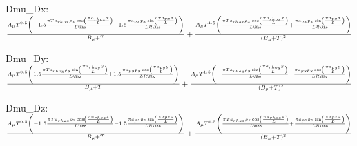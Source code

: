 

 Dmu_Dx: 
$\frac{A_{\mu} T^{0.5} \left(- 1.5 \frac{\pi T a_{rhox} \rho_{x} \operatorname{cos}\left(\frac{\pi a_{rhox} x}{L}\right)}{L \Rho} - 1.5 \frac{\pi a_{px} p_{x} \operatorname{sin}\left(\frac{\pi a_{px} x}{L}\right)}{L R \Rho}\right)}{B_{\mu} + T} + \frac{A_{\mu} T^{1.5} \left(\frac{\pi T a_{rhox} \rho_{x} \operatorname{cos}\left(\frac{\pi a_{rhox} x}{L}\right)}{L \Rho} + \frac{\pi a_{px} p_{x} \operatorname{sin}\left(\frac{\pi a_{px} x}{L}\right)}{L R \Rho}\right)}{\left(B_{\mu} + T\right)^{2}}$

 Dmu_Dy: 
$\frac{A_{\mu} T^{0.5} \left(1.5 \frac{\pi T a_{rhoy} \rho_{y} \operatorname{sin}\left(\frac{\pi a_{rhoy} y}{L}\right)}{L \Rho} + 1.5 \frac{\pi a_{py} p_{y} \operatorname{cos}\left(\frac{\pi a_{py} y}{L}\right)}{L R \Rho}\right)}{B_{\mu} + T} + \frac{A_{\mu} T^{1.5} \left(- \frac{\pi T a_{rhoy} \rho_{y} \operatorname{sin}\left(\frac{\pi a_{rhoy} y}{L}\right)}{L \Rho} - \frac{\pi a_{py} p_{y} \operatorname{cos}\left(\frac{\pi a_{py} y}{L}\right)}{L R \Rho}\right)}{\left(B_{\mu} + T\right)^{2}}$

 Dmu_Dz: 
$\frac{A_{\mu} T^{0.5} \left(- 1.5 \frac{\pi T a_{rhoz} \rho_{z} \operatorname{cos}\left(\frac{\pi a_{rhoz} z}{L}\right)}{L \Rho} - 1.5 \frac{\pi a_{pz} p_{z} \operatorname{sin}\left(\frac{\pi a_{pz} z}{L}\right)}{L R \Rho}\right)}{B_{\mu} + T} + \frac{A_{\mu} T^{1.5} \left(\frac{\pi T a_{rhoz} \rho_{z} \operatorname{cos}\left(\frac{\pi a_{rhoz} z}{L}\right)}{L \Rho} + \frac{\pi a_{pz} p_{z} \operatorname{sin}\left(\frac{\pi a_{pz} z}{L}\right)}{L R \Rho}\right)}{\left(B_{\mu} + T\right)^{2}}$